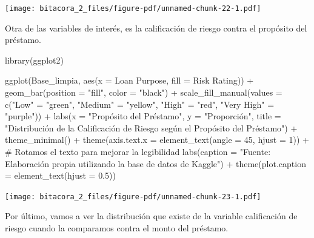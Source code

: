\documentclass[
  letterpaper,
  DIV=11,
  numbers=noendperiod]{scrreprt}
\newenvironment{Shaded}{\begin{snugshade}}{\end{snugshade}}
\newcommand{\AttributeTok}[1]{\textcolor[rgb]{0.40,0.45,0.13}{#1}}
\newcommand{\CommentTok}[1]{\textcolor[rgb]{0.37,0.37,0.37}{#1}}
\newcommand{\DecValTok}[1]{\textcolor[rgb]{0.68,0.00,0.00}{#1}}
\newcommand{\FloatTok}[1]{\textcolor[rgb]{0.68,0.00,0.00}{#1}}
\newcommand{\FunctionTok}[1]{\textcolor[rgb]{0.28,0.35,0.67}{#1}}
\newcommand{\NormalTok}[1]{\textcolor[rgb]{0.00,0.23,0.31}{#1}}
\newcommand{\OtherTok}[1]{\textcolor[rgb]{0.00,0.23,0.31}{#1}}
\newcommand{\SpecialCharTok}[1]{\textcolor[rgb]{0.37,0.37,0.37}{#1}}
\newcommand{\StringTok}[1]{\textcolor[rgb]{0.13,0.47,0.30}{#1}}
\begin{document}
\texttt{[image: bitacora\_2\_files/figure-pdf/unnamed-chunk-22-1.pdf]}

Otra de las variables de interés, es la calificación de riesgo contra el
propósito del préstamo.

\begin{Shaded}
\begin{Highlighting}[]
\FunctionTok{library}\NormalTok{(ggplot2)}

\FunctionTok{ggplot}\NormalTok{(Base\_limpia, }\FunctionTok{aes}\NormalTok{(}\AttributeTok{x =} \StringTok{\textasciigrave{}}\AttributeTok{Loan Purpose}\StringTok{\textasciigrave{}}\NormalTok{, }\AttributeTok{fill =} \StringTok{\textasciigrave{}}\AttributeTok{Risk Rating}\StringTok{\textasciigrave{}}\NormalTok{)) }\SpecialCharTok{+}  
  \FunctionTok{geom\_bar}\NormalTok{(}\AttributeTok{position =} \StringTok{"fill"}\NormalTok{, }\AttributeTok{color =} \StringTok{"black"}\NormalTok{) }\SpecialCharTok{+}  
  \FunctionTok{scale\_fill\_manual}\NormalTok{(}\AttributeTok{values =} \FunctionTok{c}\NormalTok{(}\StringTok{"Low"} \OtherTok{=} \StringTok{"green"}\NormalTok{, }\StringTok{"Medium"} \OtherTok{=} \StringTok{"yellow"}\NormalTok{, }\StringTok{"High"} \OtherTok{=} \StringTok{"red"}\NormalTok{, }\StringTok{"Very High"} \OtherTok{=} \StringTok{"purple"}\NormalTok{)) }\SpecialCharTok{+}  
  \FunctionTok{labs}\NormalTok{(}\AttributeTok{x =} \StringTok{"Propósito del Préstamo"}\NormalTok{, }\AttributeTok{y =} \StringTok{"Proporción"}\NormalTok{, }\AttributeTok{title =} \StringTok{"Distribución de la Calificación de Riesgo según el Propósito del Préstamo"}\NormalTok{) }\SpecialCharTok{+} 
  \FunctionTok{theme\_minimal}\NormalTok{() }\SpecialCharTok{+}
  \FunctionTok{theme}\NormalTok{(}\AttributeTok{axis.text.x =} \FunctionTok{element\_text}\NormalTok{(}\AttributeTok{angle =} \DecValTok{45}\NormalTok{, }\AttributeTok{hjust =} \DecValTok{1}\NormalTok{)) }\SpecialCharTok{+} \CommentTok{\# Rotamos el texto para mejorar la legibilidad}
  \FunctionTok{labs}\NormalTok{(}\AttributeTok{caption =} \StringTok{"Fuente: Elaboración propia utilizando la base de datos de Kaggle"}\NormalTok{) }\SpecialCharTok{+}
\FunctionTok{theme}\NormalTok{(}\AttributeTok{plot.caption =} \FunctionTok{element\_text}\NormalTok{(}\AttributeTok{hjust =} \FloatTok{0.5}\NormalTok{)) }
\end{Highlighting}
\end{Shaded}

\texttt{[image: bitacora\_2\_files/figure-pdf/unnamed-chunk-23-1.pdf]}

Por último, vamos a ver la distribución que existe de la variable
calificación de riesgo cuando la comparamos contra el monto del
préstamo.
\end{document}
